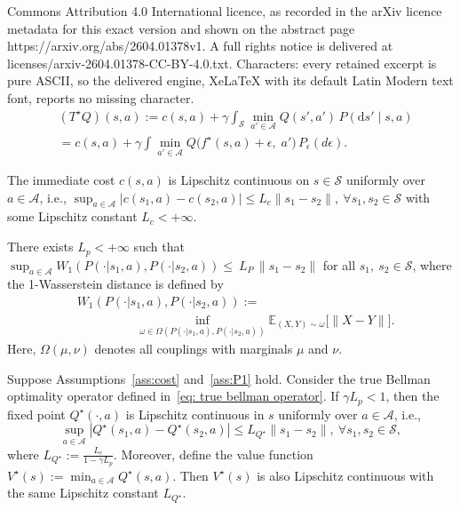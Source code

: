\documentclass[10pt,a4paper]{amsart}
\begin{document}
Commons Attribution 4.0 International licence, as recorded in the arXiv licence metadata for this exact version and shown on the abstract page https://arxiv.org/abs/2604.01378v1. A full rights notice is delivered at licenses/arxiv-2604.01378-CC-BY-4.0.txt. Characters: every retained excerpt is pure ASCII, so the delivered engine, XeLaTeX with its default Latin Modern text font, reports no missing character.
\begin{align}\label{eq: true bellman operator}
&(T^\star Q)(s,a)
:= c(s,a)
+ \gamma \int_{\mathcal{S}}
\min_{a'\in\mathcal{A}} Q(s',a')\,
P(\mathrm{d}s'\mid s,a)\nonumber\\
&=
c(s,a)
+\gamma \int \min_{a' \in \mathcal A} Q\bigl(f^\star(s,a)+\epsilon,\; a'\bigr)\,P_{\epsilon}(d\epsilon).
\end{align}

\begin{assumption}\label{ass:cost}
The immediate cost $c(s,a)$ is Lipschitz continuous on $s \in \mathcal S$ uniformly over $a \in \mathcal A$, i.e., $\sup_{a\in\mathcal A}|c(s_1,a)-c(s_2,a)| \le L_c\|s_1-s_2\|,\ \forall s_1,s_2 \in \mathcal S$
with some Lipschitz constant $L_c<+\infty$.
\end{assumption}

\begin{assumption}\label{ass:P1}
There exists $L_p < + \infty$ such that $\sup_{a\in\mathcal A} W_1 (P(\cdot|s_1,a), P(\cdot|s_2,a)) \le\ L_P\,\|s_1-s_2\|$ for all $s_1,\ s_2 \in \mathcal S$, where the 1-Wasserstein distance is defined by 
\begin{align*}
&W_1(P(\cdot|s_1,a), P(\cdot|s_2,a)):=\\
&\hspace{2cm}\inf_{\omega \in \Omega(P(\cdot|s_1,a), P(\cdot|s_2,a))}
\mathbb E_{(X,Y) \sim \omega} \bigl[\|X-Y\|\bigr].
\end{align*}
Here, $\Omega(\mu,\nu)$ denotes all couplings with marginals $\mu$ and $\nu$.
\end{assumption}

\begin{proposition}\label{prop: Q lip continuous}
Suppose Assumptions\ \ref{ass:cost} and\ \ref{ass:P1} hold. Consider the true Bellman optimality operator defined in\ \eqref{eq: true bellman operator}.  If $\gamma L_p <1$, then the fixed point $Q^\star(\cdot,a)$ is Lipschitz continuous in $s$ uniformly over $a\in\mathcal A$, i.e.,
\[
\sup_{a \in \mathcal A} |Q^\star(s_1,a)-Q^\star(s_2,a)|\le L_{Q^\star}\|s_1-s_2\|,\ \forall s_1,s_2\in\mathcal S,
\]
where $L_{Q^\star}:=\frac{L_c}{1 - \gamma L_p}$. Moreover, define the value function $V^\star(s):=\min_{a\in\mathcal A}Q^\star(s,a)$. Then $V^\star(s)$ is also Lipschitz continuous with the same Lipschitz constant $L_{Q^\star}$.
\end{proposition}
\end{document}

